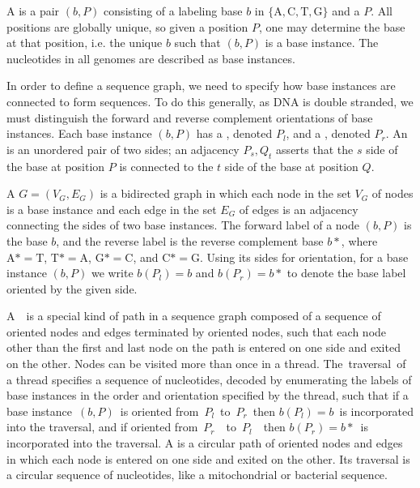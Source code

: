 \documentclass[11pt,proposal]{ucthesis}
\begin{document}
A  is a pair $(b,P)$ consisting of a labeling base $b$ in $\{\mathrm{A},\mathrm{C},\mathrm{T},\mathrm{G}\}$ and a  $P$. All positions are globally unique, so given a position $P$, one may determine the base at that position, i.e. the unique $b$ such that $(b,P)$ is a base instance. The nucleotides in all genomes are described as base instances. 

In order to define a sequence graph, we need to specify how base instances are connected to form sequences. To do this generally, as DNA is double stranded, we must distinguish the forward and reverse complement orientations of base instances. Each base instance $(b,P)$ has a , denoted $P_l$, and a , denoted $P_r$. An  is an unordered pair of two sides; an adjacency ${P_s, Q_t}$ asserts that the $s$ side of the base at position $P$ is connected to the $t$ side of the base at position $Q$. 

A  $G = (V_G,E_G)$ is a bidirected graph \cite{medvedev2009maximum} in which each node in the set $V_G$ of nodes is a base instance and each edge in the set $E_G$ of edges is an adjacency connecting the sides of two base instances. The forward label of a node $(b,P)$ is the base $b$, and the reverse label is the reverse complement base $b*$, where $\mathrm{A}* = \mathrm{T}$, $\mathrm{T}* = \mathrm{A}$, $\mathrm{G}* = \mathrm{C}$, and $\mathrm{C}* = \mathrm{G}$. Using its sides for orientation, for a base instance $(b, P)$ we write $b(P_l) = b$ and $b(P_r) = b*$ to denote the base label oriented by the given side.

A  is a special kind of path in a sequence graph composed of a sequence of oriented nodes and edges terminated by oriented nodes, such that each node other than the first and last node on the path is entered on one side and exited on the other. Nodes can be visited more than once in a thread. The traversal of a thread specifies a sequence of nucleotides, decoded by enumerating the labels of base instances in the order and orientation specified by the thread, such that if a base instance $(b, P)$ is oriented from $P_l$ to $P_r$ then $b(P_l) = b$ is incorporated into the traversal, and if oriented from $P_r$  to $P_l$  then $b(P_r) = b*$ is incorporated into the traversal. A  is a circular path of oriented nodes and edges in which each node is entered on one side and exited on the other. Its traversal is a circular sequence of nucleotides, like a mitochondrial or bacterial sequence.  
\end{document}
